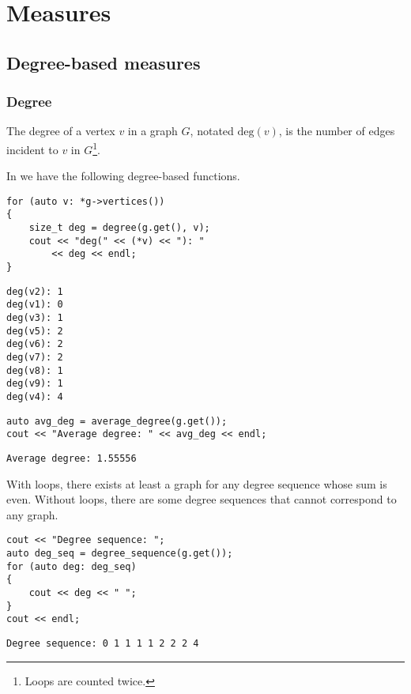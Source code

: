 \chapter{Measures} \label{ch:measures}

\section{Degree-based measures}

\subsection{Degree}

\begin{definition}[Degree]
The degree of a vertex $v$ in a graph $G$, notated $\mathrm{deg}(v)$, is the number of edges incident to $v$ in $G$\footnote{Loops are counted twice.}. 
\end{definition}

In  we have the following degree-based functions.

\begin{lstlisting}[style=c++] 
for (auto v: *g->vertices())
{
    size_t deg = degree(g.get(), v);
    cout << "deg(" << (*v) << "): "
        << deg << endl;
}
\end{lstlisting}
\begin{lstlisting}[style=out]
deg(v2): 1
deg(v1): 0
deg(v3): 1
deg(v5): 2
deg(v6): 2
deg(v7): 2
deg(v8): 1
deg(v9): 1
deg(v4): 4
\end{lstlisting}


\begin{lstlisting}[style=c++] 
auto avg_deg = average_degree(g.get());
cout << "Average degree: " << avg_deg << endl;
\end{lstlisting}
\begin{lstlisting}[style=out]
Average degree: 1.55556
\end{lstlisting}

With loops, there exists at least a graph for any degree sequence whose sum is even. Without loops, there are some degree sequences that cannot correspond to any graph.

\begin{lstlisting}[style=c++] 
cout << "Degree sequence: ";
auto deg_seq = degree_sequence(g.get());
for (auto deg: deg_seq)
{
    cout << deg << " ";
}
cout << endl;
\end{lstlisting}
\begin{lstlisting}[style=out]
Degree sequence: 0 1 1 1 1 2 2 2 4 
\end{lstlisting}
    
